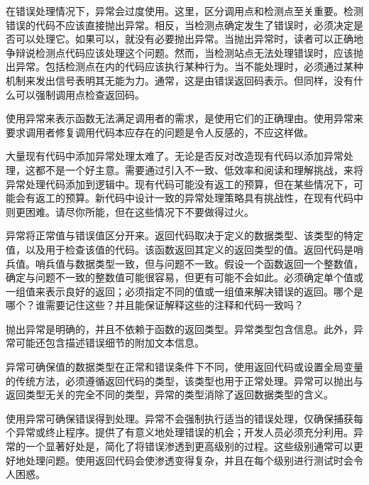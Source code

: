 
在错误处理情况下，异常会过度使用。这里，区分调用点和检测点至关重要。检测错误的代码不应该直接抛出异常。相反，当检测点确定发生了错误时，必须决定是否可以处理它。如果可以，就没有必要抛出异常。当抛出异常时，读者可以正确地争辩说检测点代码应该处理这个问题。然而，当检测站点无法处理错误时，应该抛出异常。包括检测点在内的代码应该执行某种行为。当不能处理时，必须通过某种机制来发出信号表明其无能为力。通常，这是由错误返回码表示。但同样，没有什么可以强制调用点检查返回码。

使用异常来表示函数无法满足调用者的需求，是使用它们的正确理由。使用异常来要求调用者修复调用代码本应存在的问题是令人反感的，不应这样做。


大量现有代码中添加异常处理太难了。无论是否反对改造现有代码以添加异常处理，这都不是一个好主意。需要通过引入不一致、低效率和阅读和理解挑战，来将异常处理代码添加到逻辑中。现有代码可能没有返工的预算，但在某些情况下，可能会有返工的预算。新代码中设计一致的异常处理策略具有挑战性，在现有代码中则更困难。请尽你所能，但在这些情况下不要做得过火。


异常将正常值与错误值区分开来。返回代码取决于定义的数据类型、该类型的特定值，以及用于检查该值的代码。该函数返回其定义的返回类型的值。返回代码是哨兵值。哨兵值与数据类型一致，但与问题不一致。假设一个函数返回一个整数值，确定与问题不一致的整数值可能很容易，但更有可能不会如此。必须确定单个值或一组值来表示良好的返回；必须指定不同的值或一组值来解决错误的返回。哪个是哪个？谁需要记住这些？并且能保证解释这些的注释和代码一致吗？

抛出异常是明确的，并且不依赖于函数的返回类型。异常类型包含信息。此外，异常可能还包含描述错误细节的附加文本信息。


异常可确保值的数据类型在正常和错误条件下不同，使用返回代码或设置全局变量的传统方法，必须遵循返回代码的类型，该类型也用于正常处理。异常可以抛出与返回类型无关的完全不同的类型，异常的类型消除了返回数据类型的含义。


使用异常可确保错误得到处理。异常不会强制执行适当的错误处理，仅确保捕获每个异常或终止程序。提供了有意义地处理错误的机会；开发人员必须充分利用。异常的一个显著好处是，简化了将错误渗透到更高级别的过程。这些级别通常可以更好地处理问题。使用返回代码会使渗透变得复杂，并且在每个级别进行测试时会令人困惑。

